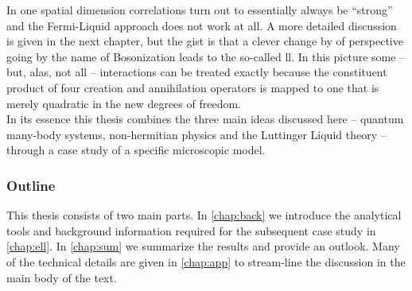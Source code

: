 In one spatial dimension correlations turn out to essentially always be ``strong'' and the Fermi-Liquid approach does not work at all.
A more detailed discussion is given in the next chapter, but the gist is that a clever change by of perspective going by the name of Bosonization leads to the so-called \acrlong{ll}.
In this picture some -- but, alas, not all -- interactions can be treated exactly because the constituent product of four creation and annihilation operators is mapped to one that is merely quadratic in the new degrees of freedom.\\
In its essence this thesis combines the three main ideas discussed here -- quantum many-body systems, non-hermitian physics and the Luttinger Liquid theory -- through a case study of a specific microscopic model.
\subsubsection{Outline}\label{sec:int:outline}
This thesis consists of two main parts.
In \autoref{chap:back} we introduce the analytical tools and background information required for the subsequent case study in \autoref{chap:ell}.
In \autoref{chap:sum} we summarize the results and provide an outlook.
Many of the technical details are given in \autoref{chap:app} to stream-line the discussion in the main body of the text.